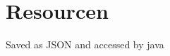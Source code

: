 \chapter{Resourcen}
\hypertarget{md_doc_2_resourcen}{}\label{md_doc_2_resourcen}
\label{md_doc_2_resourcen_autotoc_md5}%
%
 Saved as JSON and accessed by java

 